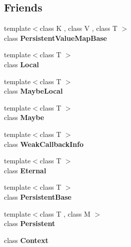 \subsection*{Friends}
\begin{DoxyCompactItemize}
\item 
\mbox{\label{classv8_1_1V8_a08e2b8f164392d71811ce6cc134f33e3}} 
{\footnotesize template$<$class K , class V , class T $>$ }\\class {\bfseries Persistent\+Value\+Map\+Base}
\item 
\mbox{\label{classv8_1_1V8_afb872edb4aac7ba55f0da004113aa2b0}} 
{\footnotesize template$<$class T $>$ }\\class {\bfseries Local}
\item 
\mbox{\label{classv8_1_1V8_a8c1dab86fc095fca89075da411a82209}} 
{\footnotesize template$<$class T $>$ }\\class {\bfseries Maybe\+Local}
\item 
\mbox{\label{classv8_1_1V8_ae606ba8c3656041ee7ec7532d02a3bdb}} 
{\footnotesize template$<$class T $>$ }\\class {\bfseries Maybe}
\item 
\mbox{\label{classv8_1_1V8_aeeef5ad4ce5906cf147f93645284ebdf}} 
{\footnotesize template$<$class T $>$ }\\class {\bfseries Weak\+Callback\+Info}
\item 
\mbox{\label{classv8_1_1V8_adf5d8780aceb9310fb1246aae7ec348e}} 
{\footnotesize template$<$class T $>$ }\\class {\bfseries Eternal}
\item 
\mbox{\label{classv8_1_1V8_abb172e0bb22fc5fed7a3a66f29d046ce}} 
{\footnotesize template$<$class T $>$ }\\class {\bfseries Persistent\+Base}
\item 
\mbox{\label{classv8_1_1V8_ad845ec8872174be0a9ca9a3dd1898d30}} 
{\footnotesize template$<$class T , class M $>$ }\\class {\bfseries Persistent}
\item 
\mbox{\label{classv8_1_1V8_ac26c806e60ca4a0547680edb68f6e39b}} 
class {\bfseries Context}
\end{DoxyCompactItemize}


